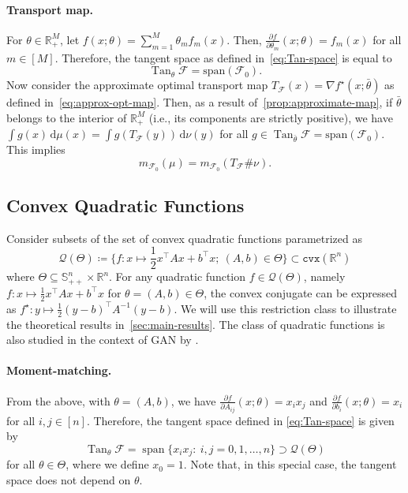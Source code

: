 \documentclass[10pt]{article}
\newcommand{\ud}{\,\mathrm{d}}
\newcommand{\op}[1]{\operatorname{#1}}
\newcommand{\Tan}{\op{Tan}}
\newcommand{\cvx}{\mathtt{cvx}}
\newcommand{\real}{\mathbb{R}}
\newcommand{\calF}{\mathcal{F}}
\newcommand{\Q}{\mathcal{Q}}
\numberwithin{equation}{section}
\begin{document}
\paragraph{Transport map.}
For $\theta \in \real^M_+$, let $f(x;\theta) = \sum_{m=1}^M \theta_m f_m(x)$. Then, $\frac{\partial f}{\partial \theta_m} (x;\theta)= f_m(x)$ for all $m\in [M]$. Therefore, the tangent space as defined in~\eqref{eq:Tan-space} is equal to 
\begin{equation*}
\Tan_\theta \calF = \text{span}(\calF_0).
\end{equation*} 
Now consider the approximate optimal transport map $T_{\calF}(x)=\nabla f^\star(x;\bar{\theta})$ as defined in~\eqref{eq:approx-opt-map}. Then, as a result of~\autoref{prop:approximate-map}, if $\bar{\theta}$ belongs to the interior of $\real^M_{+}$ (i.e., its components are strictly positive), we have $\int g(x)\ud \mu(x) = \int g(T_{\calF}(y))\ud \nu(y)$ for all $g \in \Tan_{\bar{\theta}}\calF = \text{span}(\calF_0)$. This implies \[m_{\calF_0}(\mu)=m_{\calF_0}(T_\calF \# \nu).\]


\subsection{Convex Quadratic Functions}\label{sec:restr-quad}
Consider subsets of the set of convex quadratic functions parametrized as
\begin{equation*}%
\Q(\Theta)\coloneqq \bigl\{f:x\mapsto \frac{1}{2}x^\top A x + b^\top x;~(A,b)\in \Theta \bigr\} \subset \cvx(\mathbb{R}^n)
\end{equation*}
where $\Theta \subseteq \mathbb{S}^n_{++}\times \real^n$. For any quadratic function $f \in \Q(\Theta)$, namely $f:x\mapsto \frac{1}{2}x^\top A x + b^\top x$ for $\theta=(A,b)\in\Theta$, the convex conjugate can be expressed as $f^\star: y\mapsto \frac{1}{2}(y-b)^\top A^{-1}(y-b)$. We will use this restriction class to illustrate the theoretical results in~\autoref{sec:main-results}. The class of quadratic functions is also studied in the context of GAN by \citet{feizi2017understanding}. 


\paragraph{Moment-matching.}
From the above, with $\theta=(A,b)$, we have 
$\frac{\partial f}{\partial A_{ij}}(x;\theta)=x_ix_j$ and $\frac{\partial f}{\partial b_{i}}(x;\theta)=x_i$ for all $i,j\in[n]$. 
Therefore, the tangent space defined in \eqref{eq:Tan-space} is given by 
\begin{equation}\label{eq:quad-T}
\Tan_{\theta} \calF = \op{span}\{x_ix_j:~ i,j=0,1,\ldots,n\} \supset \Q(\Theta)
\end{equation}
for all $\theta \in \Theta$, where we define $x_0 = 1$. Note that, in this special case, the tangent space does not depend on $\theta$. 
\end{document}
